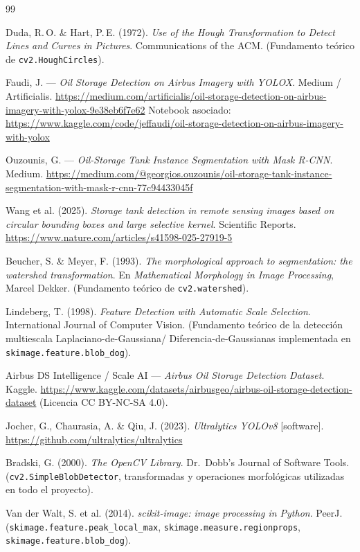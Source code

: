 \documentclass[11pt,a4paper]{article}
\begin{document}
\begin{thebibliography}{99}

Duda, R.\,O. \& Hart, P.\,E. (1972).
\emph{Use of the Hough Transformation to Detect Lines and Curves in Pictures}.
Communications of the ACM. (Fundamento teórico de \texttt{cv2.HoughCircles}).

Faudi, J. --- \emph{Oil Storage Detection on Airbus Imagery with YOLOX}.
Medium / Artificialis.
\url{https://medium.com/artificialis/oil-storage-detection-on-airbus-imagery-with-yolox-9e38eb6f7e62}
Notebook asociado:
\url{https://www.kaggle.com/code/jeffaudi/oil-storage-detection-on-airbus-imagery-with-yolox}

Ouzounis, G. --- \emph{Oil-Storage Tank Instance Segmentation with Mask R-CNN}.
Medium.
\url{https://medium.com/@georgios.ouzounis/oil-storage-tank-instance-segmentation-with-mask-r-cnn-77c94433045f}

Wang et al. (2025).
\emph{Storage tank detection in remote sensing images based on circular bounding
boxes and large selective kernel}. Scientific Reports.
\url{https://www.nature.com/articles/s41598-025-27919-5}

Beucher, S. \& Meyer, F. (1993).
\emph{The morphological approach to segmentation: the watershed transformation}.
En \emph{Mathematical Morphology in Image Processing}, Marcel Dekker.
(Fundamento teórico de \texttt{cv2.watershed}).

Lindeberg, T. (1998).
\emph{Feature Detection with Automatic Scale Selection}.
International Journal of Computer Vision.
(Fundamento teórico de la detección multiescala Laplaciano-de-Gaussiana/
Diferencia-de-Gaussianas implementada en \texttt{skimage.feature.blob\_dog}).

Airbus DS Intelligence / Scale AI --- \emph{Airbus Oil Storage Detection Dataset}.
Kaggle. \url{https://www.kaggle.com/datasets/airbusgeo/airbus-oil-storage-detection-dataset}
(Licencia CC BY-NC-SA 4.0).

Jocher, G., Chaurasia, A. \& Qiu, J. (2023).
\emph{Ultralytics YOLOv8} [software].
\url{https://github.com/ultralytics/ultralytics}

Bradski, G. (2000).
\emph{The OpenCV Library}. Dr.\ Dobb's Journal of Software Tools.
(\texttt{cv2.SimpleBlobDetector}, transformadas y operaciones morfológicas
utilizadas en todo el proyecto).

Van der Walt, S. et al. (2014).
\emph{scikit-image: image processing in Python}. PeerJ.
(\texttt{skimage.feature.peak\_local\_max}, \texttt{skimage.measure.regionprops},
\texttt{skimage.feature.blob\_dog}).

\end{thebibliography}
\end{document}
